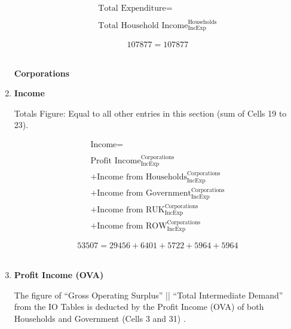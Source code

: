 \begin{enumerate}
\begin{equation}
\begin{split}
\text{Total Expenditure} =  \\ \\
\text{Total Household Income}^\text{Households}_\text{IncExp}
\end{split} \label{eq:2.5.21}
\end{equation}

\begin{equation} \nonumber
107877 = 107877
\end{equation}\\



\newpage


\begin{center}
\textbf{\LARGE Corporations}
\end{center}

\item \textbf {Income}

Totals Figure: Equal to all  other entries in this section (sum of Cells 19 to 23).

\begin{equation}
\begin{split}
\text{Income} =  \\ \\
\text{Profit Income}^\text{Corporations}_\text{IncExp}\\
+\text{Income from Households}^\text{Corporations}_\text{IncExp}\\
+\text{Income from Government}^\text{Corporations}_\text{IncExp}\\
+\text{Income from RUK}^\text{Corporations}_\text{IncExp}\\
+\text{Income from ROW}^\text{Corporations}_\text{IncExp}
\end{split} \label{eq:2.5.22}
\end{equation}

\begin{equation} \nonumber
53507 = 29456+6401+5722+5964+5964
\end{equation}\\

\item \textbf {Profit Income (OVA)}

The figure of ``Gross Operating Surplus'' || ``Total Intermediate Demand''  from the IO Tables is deducted by the Profit Income (OVA) of both Households and Government (Cells 3 and 31) \cite{ScotGov2013a,ONS2011b}.


\end{enumerate}
